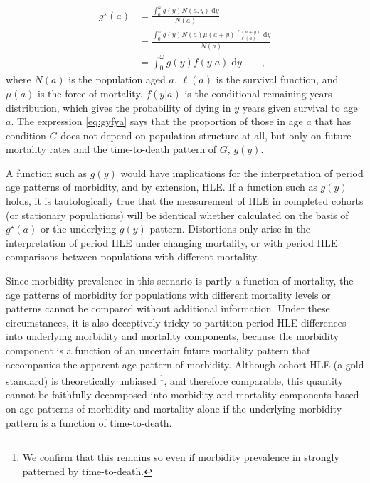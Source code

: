 \documentclass[11pt,oneside,a4paper]{article} %
\newcommand{\dd}{\; \mathrm{d}}
\newcommand{\tc}{\quad\quad\text{,}}
\begin{document}
\begin{align}
g^\star(a) &= \frac{\int _0^\omega g(y) N(a,y) \dd y}{N(a)} \\
      &= \frac{\int _0^\omega g(y) N(a)
      \mu(a+y)\frac{\ell(a+y)}{\ell(a)}\dd y}{N(a)}\\
      &= \int _0^\omega g(y) f(y|a)\dd y \label{eq:gyfya}\tc
\end{align}
where $N(a)$ is the population aged $a$, $\ell(a)$ is the survival function, and
$\mu(a)$ is the force of mortality. $f(y|a)$ is the conditional remaining-years
distribution, which gives the probability of dying in $y$ years given survival
to age $a$. The expression \eqref{eq:gyfya} says that the proportion of those in
age $a$ that has condition $G$ does not depend on population structure at all, but only on future mortality rates and the time-to-death pattern of $G$, $g(y)$. 

A function such as $g(y)$ would have implications for the interpretation of
period age patterns of morbidity, and by extension, HLE. If a function such as $g(y)$ holds, it is tautologically true that the
measurement of HLE in completed cohorts (or stationary populations)
will be identical whether calculated on the basis of $g^\star(a)$ or the
underlying $g(y)$ pattern. Distortions only arise in the interpretation of
period HLE under changing mortality, or with period HLE comparisons between
populations with different mortality. 


Since morbidity prevalence in this scenario is partly a function of mortality,
 the age patterns of morbidity for populations with different mortality
levels or patterns cannot be compared without additional information. Under
these circumstances, it is also deceptively tricky to partition period HLE
differences into underlying morbidity and mortality components, because the
morbidity component is a function of an uncertain future mortality pattern
that accompanies the apparent age pattern of morbidity. Although cohort HLE (a
gold standard) is theoretically unbiased \citep{imai2007estimation}\footnote{We confirm that this remains so even if morbidity prevalence in strongly patterned by time-to-death.}, and therefore comparable, this quantity cannot be faithfully
decomposed into morbidity and mortality components based on age patterns of morbidity and mortality alone if
the underlying morbidity pattern is a function of time-to-death.
\end{document}
